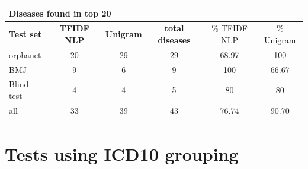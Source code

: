 \documentclass[10pt,letterpaper,final]{article}
\begin{document}
\begin{center}
\begin{small}
\begin{tabular}{l|cc||ccc}
	\multicolumn{6}{l}{\textbf{Diseases found in top 20}} \\ \hline
\textbf{Test set} & \textbf{TFIDF NLP} &	\textbf{Unigram}	 &	\textbf{total diseases} &	\% TFIDF NLP	 &\% Unigram \\ \hline
orphanet    &    20   & 29     & 29      &   68.97   & 100\\
BMJ	        &    9   &   6   &    9   &  100    & 66.67\\
Blind test	&    4   &   4   &    5   & 80     & 80 \\ \hline \hline
all	        &    33   &  39    &   43    & 76.74     & 90.70 \\ \hline
\end{tabular}
\end{small}
\end{center}


\newpage
\section{Tests using ICD10 grouping}
\label{app:icd10_icd10recalc}
\end{document}
